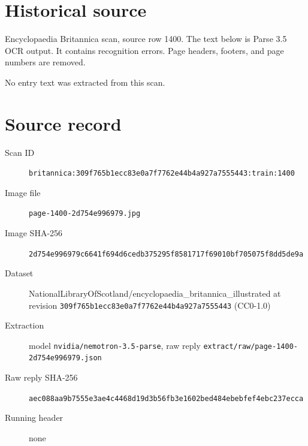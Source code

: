 \documentclass{article}
\begin{document}
\section*{Historical source}
Encyclopaedia Britannica scan, source row 1400. The text below is Parse 3.5 OCR output. It contains recognition errors.
Page headers, footers, and page numbers are removed.

No entry text was extracted from this scan.

\section*{Source record}
\begin{description}
\item[Scan ID] \texttt{britannica:309f765b1ecc83e0a7f7762e44b4a927a7555443:train:1400}
\item[Image file] \texttt{page-1400-2d754e996979.jpg}
\item[Image SHA-256] \texttt{2d754e996979c6641f694d6cedb375295f8581717f69010bf705075f8dd5de9a}
\item[Dataset] NationalLibraryOfScotland/encyclopaedia\_britannica\_illustrated at revision \texttt{309f765b1ecc83e0a7f7762e44b4a927a7555443} (CC0-1.0)
\item[Extraction] model \texttt{nvidia/nemotron-3.5-parse}, raw reply \texttt{extract/raw/page-1400-2d754e996979.json}
\item[Raw reply SHA-256] \texttt{aec088aa9b7555e3ae4c4468d19d3b56fb3e1602bed484ebebfef4ebc237ecca}

\item[Running header] none
\end{description}
\end{document}
